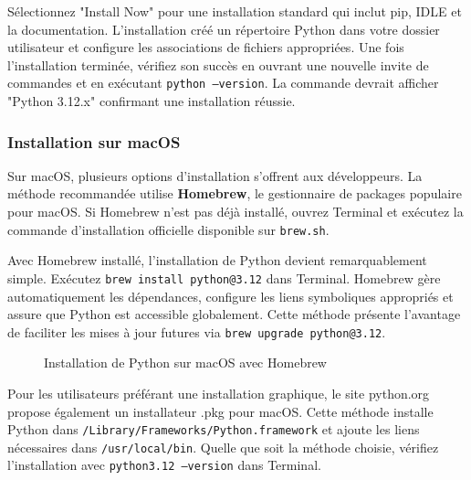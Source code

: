 Sélectionnez "Install Now" pour une installation standard qui inclut pip, IDLE et la documentation. L'installation créé un répertoire Python dans votre dossier utilisateur et configure les associations de fichiers appropriées. Une fois l'installation terminée, vérifiez son succès en ouvrant une nouvelle invite de commandes et en exécutant \texttt{python --version}. La commande devrait afficher "Python 3.12.x" confirmant une installation réussie.

\subsubsection{Installation sur macOS}

Sur macOS, plusieurs options d'installation s'offrent aux développeurs. La méthode recommandée utilise \textbf{Homebrew}, le gestionnaire de packages populaire pour macOS. Si Homebrew n'est pas déjà installé, ouvrez Terminal et exécutez la commande d'installation officielle disponible sur \texttt{brew.sh}.

Avec Homebrew installé, l'installation de Python devient remarquablement simple. Exécutez \texttt{brew install python@3.12} dans Terminal. Homebrew gère automatiquement les dépendances, configure les liens symboliques appropriés et assure que Python est accessible globalement. Cette méthode présente l'avantage de faciliter les mises à jour futures via \texttt{brew upgrade python@3.12}.

\begin{figure}[H]
\centering
{}
\caption{Installation de Python sur macOS avec Homebrew}
\end{figure}

Pour les utilisateurs préférant une installation graphique, le site python.org propose également un installateur .pkg pour macOS. Cette méthode installe Python dans \texttt{/Library/Frameworks/Python.framework} et ajoute les liens nécessaires dans \texttt{/usr/local/bin}. Quelle que soit la méthode choisie, vérifiez l'installation avec \texttt{python3.12 --version} dans Terminal.

